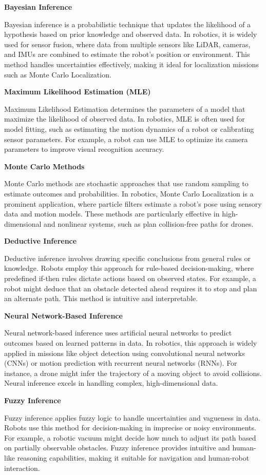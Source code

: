 \documentclass{book}
\providecommand{\ProjectDeepHeading}[2]{%
    \par\medskip\noindent\textbf{#2}\par\smallskip
}
\begin{document}
    \ProjectDeepHeading{5}{Bayesian Inference}
    Bayesian inference is a probabilistic technique that updates the likelihood of a hypothesis based on prior knowledge and observed data. In robotics, it is widely used for sensor fusion, where data from multiple sensors like LiDAR, cameras, and IMUs are combined to estimate the robot's position or environment. This method handles uncertainties effectively, making it ideal for localization missions such as Monte Carlo Localization.

    \ProjectDeepHeading{5}{Maximum Likelihood Estimation (MLE)}
    Maximum Likelihood Estimation determines the parameters of a model that maximize the likelihood of observed data. In robotics, MLE is often used for model fitting, such as estimating the motion dynamics of a robot or calibrating sensor parameters. For example, a robot can use MLE to optimize its camera parameters to improve visual recognition accuracy. 

    \ProjectDeepHeading{5}{Monte Carlo Methods}
    Monte Carlo methods are stochastic approaches that use random sampling to estimate outcomes and probabilities. In robotics, Monte Carlo Localization is a prominent application, where particle filters estimate a robot’s pose using sensory data and motion models. These methods are particularly effective in high-dimensional and nonlinear systems, such as plan collision-free paths for drones.

    \ProjectDeepHeading{5}{Deductive Inference}
    Deductive inference involves drawing specific conclusions from general rules or knowledge. Robots employ this approach for rule-based decision-making, where predefined if-then rules dictate actions based on observed states. For example, a robot might deduce that an obstacle detected ahead requires it to stop and plan an alternate path. This method is intuitive and interpretable. 

    \ProjectDeepHeading{5}{Neural Network-Based Inference}
    Neural network-based inference uses artificial neural networks to predict outcomes based on learned patterns in data. In robotics, this approach is widely applied in missions like object detection using convolutional neural networks (CNNs) or motion prediction with recurrent neural networks (RNNs). For instance, a drone might infer the trajectory of a moving object to avoid collisions. Neural inference excels in handling complex, high-dimensional data.

    \ProjectDeepHeading{5}{Fuzzy Inference}
    Fuzzy inference applies fuzzy logic to handle uncertainties and vagueness in data. Robots use this method for decision-making in imprecise or noisy environments. For example, a robotic vacuum might decide how much to adjust its path based on partially observable obstacles. Fuzzy inference provides intuitive and human-like reasoning capabilities, making it suitable for navigation and human-robot interaction.
\end{document}
